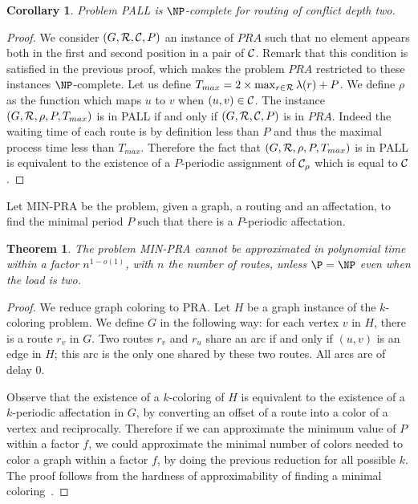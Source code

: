 \documentclass[a4paper,10pt]{article}
\newtheorem{theorem}{Theorem}
\newtheorem{corollary}{Corollary}
\begin{document}
\begin{corollary}
Problem PALL is $\NP$-complete for routing of conflict depth two.
\end{corollary}
\begin{proof}
 We consider $(G,{\cal R},{\cal C},P)$ an instance of $PRA$ such that no element appears both in the first and second position in a pair of ${\cal C}$. Remark that this condition is satisfied in the previous proof, which makes the problem $PRA$ restricted to these instances $\NP$-complete. 
 Let us define $T_{max} = 2 \times \max_{r \in {\cal R}} \lambda(r) + P$. We define $\rho$ as the function which maps 
 $u$ to $v$ when $(u,v) \in {\cal C}$. The instance $(G,{\cal R},\rho,P,T_{max})$ is in PALL if and only if $(G,{\cal R},{\cal C},P)$
 is in $PRA$. Indeed the waiting time of each route is by definition less than $P$ and thus the maximal process time less than $T_{max}$. Therefore the fact that $(G,{\cal R},\rho,P,T_{max})$ is in PALL is equivalent to the existence of a $P$-periodic assignment of ${\cal C}_{\rho}$ which is equal to ${\cal C}$.
\end{proof}
% 
% 

Let MIN-PRA be the problem, given a graph, a routing and an affectation, to find the minimal period $P$ such that there is a $P$-periodic affectation. 

\begin{theorem}
 The problem MIN-PRA cannot be approximated in polynomial time within a factor $n^{1-o(1)}$, with $n$ the number of routes, unless $\P = \NP$ even when the load is two.
\end{theorem}

\begin{proof}
 We reduce graph coloring to PRA. Let $H$ be a graph instance of the $k$-coloring problem. 
 We define $G$ in the following way: for each vertex $v$ in $H$, there is a route $r_v$ in $G$.
 Two routes $r_v$ and $r_u$ share an arc if and only if $(u,v)$ is an edge in $H$; this arc is the only one shared by these two routes.   
 All arcs are of delay $0$. 
 
 Observe that the existence of a $k$-coloring of $H$ is equivalent to the existence of a $k$-periodic affectation in $G$, 
 by converting an offset of a route into a color of a vertex and reciprocally. Therefore if we can approximate the minimum value of $P$ within a factor $f$,
 we could approximate the minimal number of colors needed to color a graph within a factor $f$, by doing the previous reduction for all possible $k$. The proof follows from the hardness of approximability of finding a minimal coloring~\cite{zuckerman2006linear}.
\end{proof}
\end{document}
